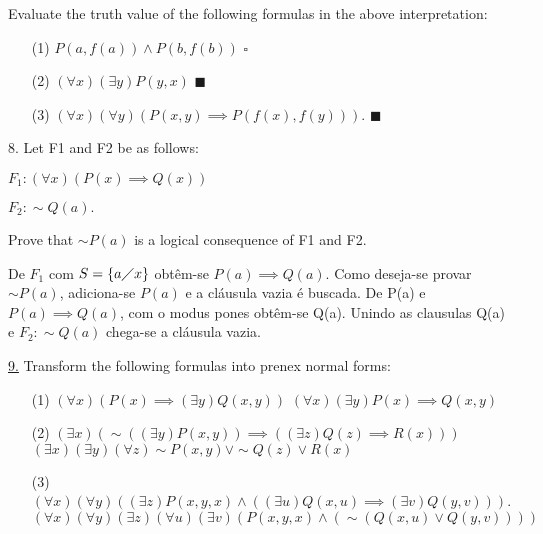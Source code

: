 Evaluate the truth value of the following formulas in the above interpretation:
\begin{itemize}
 \item[(1)] $ P(a, f(a)) \wedge P(b, f(b)) $ \newline
$ \square $
 \item[(2)] $ (\forall x) (\exists y) P(y,x) $ \newline
$ \blacksquare $
 \item[(3)] $ (\forall x) (\forall y) (P(x,y) \implies P(f(x),f(y))) $. \newline
$ \blacksquare $
\end{itemize}

8. Let F1 and F2 be as follows:

$ F_1: (\forall x) (P(x) \implies Q(x)) $

$ F_2: \sim Q(a). $

Prove that $\sim P(a)$ is a logical consequence of F1 and F2.

De $F_1$ com $ S = \{ a \diagup x\} $ obtêm-se $ P(a) \implies Q(a) $. Como deseja-se provar $\sim P(a)$, adiciona-se $ P(a) $ e a cláusula vazia é buscada. De P(a) e $ P(a) \implies Q(a) $, com o modus pones obtêm-se Q(a). Unindo as clausulas Q(a) e $ F_2: \sim Q(a) $ chega-se a cláusula vazia.

\underline{9.} Transform the following formulas into prenex normal forms:
\begin{itemize}
 \item[(1)] $ (\forall x) (P(x) \implies (\exists y) Q(x,y)) $ \newline
$(\forall x) (\exists y) P(x) \implies Q(x, y) $
 \item[(2)] $ (\exists x) (\sim((\exists y)P(x,y)) \implies ((\exists z) Q(z) \implies R(x))) $ \newline
$(\exists x)(\exists y)(\forall z) \sim P(x,y) \vee \sim Q(z) \vee R(x) $
 \item[(3)] $ (\forall x)(\forall y)((\exists z) P(x,y,x) \wedge((\exists u) Q(x,u) \implies (\exists v) Q(y,v))) $. \newline
$ (\forall x)(\forall y)(\exists z)(\forall u)(\exists v)(P(x,y,x) \wedge (\sim (Q(x,u) \vee Q(y,v)))) $
\end{itemize}

